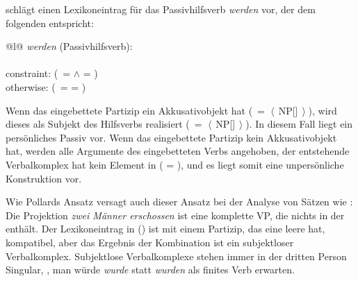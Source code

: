 {\citet[]{Kathol94a} schlägt einen Lexikoneintrag für
das Passivhilfsverb \emph{werden} vor, der dem folgenden entspricht:

\ea
\begin{tabular}[t]{@{}l@{}}
\emph{werden} (Passivhilfsverb):\\
\\
constraint: (\, =  $\wedge$  = )\\[2mm]
otherwise: (\, =  = \liste{})
\end{tabular}
\z
Wenn das eingebettete Partizip ein Akkusativobjekt hat 
(\, = $\left\langle\right.$\,NP[]\,$\left.\right\rangle$), 
wird dieses als Subjekt des Hilfsverbs realisiert
(\, = $\left\langle\right.$\,NP[]\,$\left.\right\rangle$).
In diesem Fall liegt ein persönliches Passiv vor. Wenn das eingebettete Partizip kein Akkusativobjekt hat,
werden alle Argumente des eingebetteten Verbs  angehoben, der entstehende Verbalkomplex
hat kein Element in \subj ( = \eliste{}), und es liegt somit eine unpersönliche Konstruktion vor.

Wie Pollards Ansatz versagt auch dieser Ansatz bei der Analyse von Sätzen
wie : Die Projektion \emph{zwei Männer
erschossen} ist eine komplette VP, die nichts in der \subcatl enthält.
Der Lexikoneintrag in () ist mit einem Partizip, das eine leere \subcatl hat, kompatibel,
aber das Ergebnis der Kombination ist ein subjektloser Verbalkomplex.
Subjektlose Verbalkomplexe stehen immer in der dritten Person Singular, 
\dash, man würde \emph{wurde} statt \emph{wurden} als finites Verb erwarten.

%
%



}
